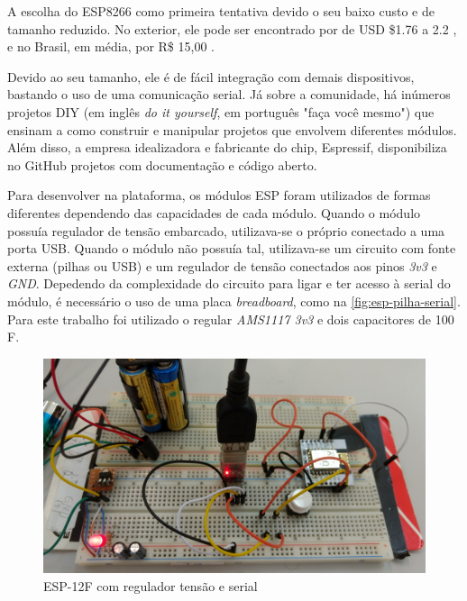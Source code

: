 A escolha do ESP8266 como primeira tentativa devido o seu baixo custo e de
tamanho reduzido. No exterior, ele pode ser encontrado por de
USD \$1.76 a 2.2 , e no
Brasil, em média, por R\$ 15,00 .

Devido ao seu tamanho, ele é de fácil integração com demais dispositivos,
bastando o uso de uma comunicação serial. Já sobre a comunidade, há inúmeros
projetos DIY (em inglês \emph{do it yourself}, em português "faça você mesmo") que
ensinam a como construir e manipular projetos que envolvem diferentes módulos.
Além disso, a empresa  idealizadora e fabricante do chip, Espressif,
disponibiliza no GitHub projetos com documentação e código aberto.

Para desenvolver na plataforma, os módulos ESP foram utilizados de formas
diferentes dependendo das capacidades de cada módulo.
Quando o módulo
possuía regulador de tensão embarcado, utilizava-se o próprio conectado a uma
porta USB. Quando o módulo não possuía tal, utilizava-se um circuito com fonte
externa (pilhas ou USB) e um regulador de tensão conectados aos pinos \emph{3v3} e \emph{GND}.
Depedendo da complexidade do circuito para ligar e ter acesso à serial do
módulo, é necessário o uso de uma placa \emph{breadboard}, como na \autoref{fig:esp-pilha-serial}.
Para este trabalho foi utilizado o regular \emph{AMS1117 3v3} e dois capacitores de 100 \mu F.

\begin{figure}[htb]
	\caption{\label{fig:esp-pilha-serial}ESP-12F com regulador tensão e serial}
	\begin{center}
		\includegraphics[width=1\textwidth]{040-plataformas/esp-dev/breadboard.jpg}
	\end{center}
\end{figure}


